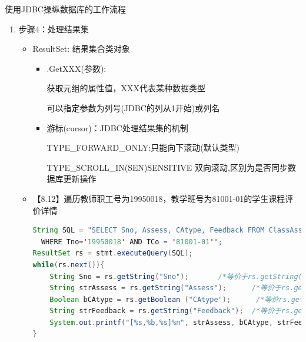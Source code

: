 \begin{frame}{使用JDBC操纵数据库的工作流程}
\begin{enumerate}
    \framebreak
    \item 步骤4：处理结果集
    \begin{itemize}
        \item ResultSet: 结果集合类对象
        \begin{itemize}
            \item .GetXXX(参数): 
        
            获取元组的属性值，XXX代表某种数据类型
            
            可以指定参数为列号(JDBC的列从1开始)或列名
            
            \item 游标(cursor)：JDBC处理结果集的机制

            TYPE\_FORWARD\_ONLY:只能向下滚动(默认类型)
            
            TYPE\_SCROLL\_IN(SEN)SENSITIVE 双向滚动,区别为是否同步数据库更新操作
        \end{itemize}
    \framebreak
    \item 【8.12】遍历教师职工号为19950018，教学班号为81001-01的学生课程评价详情
\begin{block}{}
\begin{lstlisting}[language=Java, linewidth=\textwidth]
String SQL = "SELECT Sno, Assess, CAtype, Feedback FROM ClassAssess
  WHERE Tno='19950018' AND TCo = '81001-01'";
ResultSet rs = stmt.executeQuery(SQL);
while(rs.next()){
    String Sno = rs.getString("Sno");       /*等价于rs.getString(1)*/
    String strAssess = rs.getString("Assess");      /*等价于rs.getString(2) */
    Boolean bCAtype = rs.getBoolean ("CAtype");      /*等价rs.getBoolean (3) */
    String strFeedback = rs.getString("Feedback");  /*等价于rs.getString(4) */
    System.out.printf("[%s,%b,%s]%n", strAssess, bCAtype, strFeedback);
}
\end{lstlisting}
\end{block}



\end{itemize}
\end{enumerate}
\end{frame}

